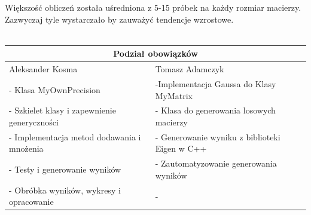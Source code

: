 \documentclass[8pt]{article}
\begin{document}
Większość obliczeń została uśredniona z 5-15 próbek na każdy rozmiar macierzy. Zazwyczaj tyle wystarczało by zauważyć tendencje wzrostowe.\\
\\
\begin{tabular}{ | p{8.3cm} | p{8.3cm} | }
  \hline
  \multicolumn{2}{|c|}{Podział obowiązków} \\
  \hline
  Aleksander Kosma & Tomasz Adamczyk \\
  \hline
  - Klasa MyOwnPrecision & -Implementacja  Gaussa do Klasy MyMatrix \\\hline
  - Szkielet klasy i zapewnienie generyczności & - Klasa do generowania losowych macierzy \\\hline
  - Implementacja metod dodawania i mnożenia & - Generowanie wyniku z biblioteki Eigen w C++ \\\hline
  - Testy i generowanie wyników & - Zautomatyzowanie generowania wyników \\\hline
  - Obróbka wyników, wykresy i opracowanie & - \\\hline
  
  \hline
\end{tabular}
\end{document}
